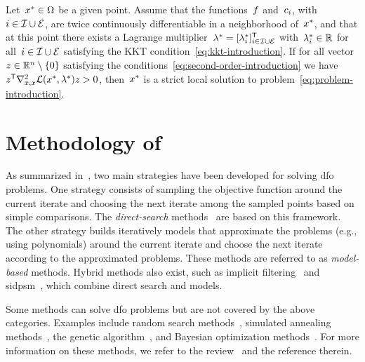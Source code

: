\begin{theorem}
    \label{thm:second-order-sufficient-conditions}
    Let~$\iter[\ast] \in \fset$ be a given point.
    Assume that the functions~$f$ and~$c_{i}$, with~$i \in \mathcal{I} \cup \mathcal{E}$, are twice continuously differentiable in a neighborhood of~$\iter[\ast]$, and that at this point there exists a Lagrange multiplier~$\lm[\ast] = [\lm[\ast]_i]_{i \in \iub \cup \ieq}^{\T}$ with~$\lm[\ast]_i \in \R$ for all~$i \in \mathcal{I} \cup \mathcal{E}$ satisfying the KKT condition~\cref{eq:kkt-introduction}.
    If for all vector~$z \in \mathbb{R}^n \setminus \{0\}$ satisfying the conditions~\cref{eq:second-order-introduction} we have~$z^{\T} \nabla_{x, x}^2 \lag(\iter[\ast], \lm[\ast]) z > 0$, then~$\iter[\ast]$ is a strict local solution to problem~\cref{eq:problem-introduction}.
\end{theorem}

\section{Methodology of }
\label{sec:methodology-dfo}

As summarized in~\cite{Conn_Scheinberg_Vicente_2009b}, two main strategies have been developed for solving \gls{dfo} problems.
One strategy consists of sampling the objective function around the current iterate and choosing the next iterate among the sampled points based on simple comparisons.
The \emph{direct-search} methods~\cite{Kolda_Lewis_Torczon_2003} are based on this framework.
The other strategy builds iteratively models that approximate the problems (e.g., using polynomials) around the current iterate and choose the next iterate according to the approximated problems.
These methods are referred to as \emph{model-based} methods.
Hybrid methods also exist, such as implicit filtering~\cite{Kelley_2011} and \gls{sidpsm}~\cite{Custodio_Rocha_Vicente_2009}, which combine direct search and models.

Some methods can solve \gls{dfo} problems but are not covered by the above categories.
Examples include random search methods~\cite{Zhigljavsky_1991}, simulated annealing methods~\cite{Kirkpatrick_Gelatt_Vecchi_1983}, the genetic algorithm~\cite{Jong_1975,Holland_1975}, and Bayesian optimization methods~\cite{Mockus_1975,Shahriari_Etal_2016}.
For more information on these methods, we refer to the review~\cite{Larson_Menickelly_Wild_2019} and the reference therein.

